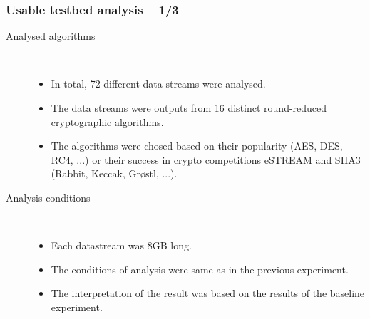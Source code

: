 \documentclass[aspectratio=169]{beamer}
\begin{document}
\begin{frame}
\frametitle{Usable testbed analysis -- 1/3}

\begin{description}
\item[Analysed algorithms] \hfill \\
\begin{itemize}
\item In total, 72 different data streams were analysed.
\item The data streams were outputs from 16 distinct round-reduced cryptographic algorithms.
\item The algorithms were chosed based on their popularity (AES, DES, RC4, ...) or their success in crypto competitions eSTREAM and SHA3 (Rabbit, Keccak, Gr\o stl, ...).
\end{itemize}
\vspace{.2cm}
\item[Analysis conditions] \hfill \\
\begin{itemize}
\item Each datastream was 8GB long.
\item The conditions of analysis were same as in the previous experiment.
\item The interpretation of the result was based on the results of the baseline experiment.
\end{itemize}
\end{description}

\end{frame}
\end{document}
